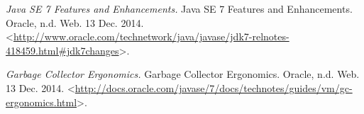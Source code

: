 \begin{thebibliography}{9}

\textit{Java SE 7 Features and Enhancements.} Java SE 7 Features and Enhancements. Oracle, n.d. Web. 13 Dec. 2014. <\url{http://www.oracle.com/technetwork/java/javase/jdk7-relnotes-418459.html#jdk7changes}>.


\textit{Garbage Collector Ergonomics.} Garbage Collector Ergonomics. Oracle, n.d. Web. 13 Dec. 2014. <\url{http://docs.oracle.com/javase/7/docs/technotes/guides/vm/gc-ergonomics.html}>.


\end{thebibliography}